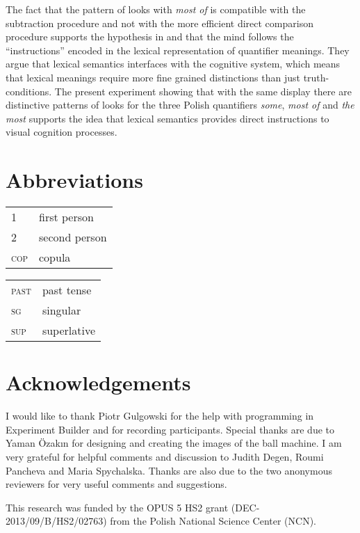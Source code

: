 \documentclass[output=paper]{langscibook}
\begin{document}
The fact that the pattern of looks with \textit{most of} is compatible with the subtraction procedure and not with the
more efficient direct comparison procedure supports the hypothesis in \citet{pietroski2009meaning} and
\citet{lidz2011interface}
that the mind follows the “instructions” encoded in the lexical representation of quantifier meanings. They argue that
lexical semantics interfaces with the cognitive system, which means that lexical meanings require more fine grained
distinctions than just truth-conditions. The present experiment showing that with the same display there are
distinctive patterns of looks for the three Polish quantifiers \textit{some}, \textit{most of} and \textit{the most}
supports the idea that lexical semantics provides direct instructions to visual cognition processes.







%

\section*{Abbreviations}

\begin{tabularx}{.5\textwidth}{@{}lX@{}}
\textsc{1}&first person\\
\textsc{2}&second person\\
\textsc{cop}&{copula}\\
\end{tabularx}%
\begin{tabularx}{.5\textwidth}{@{}lX@{}}
\textsc{past}&past tense\\
\textsc{sg}&singular\\
\textsc{sup}&superlative\\
\end{tabularx}

\section*{Acknowledgements}
I would like to thank Piotr Gulgowski for the help with programming in Experiment Builder and for recording
participants. Special thanks are due to Yaman Özakın for designing and creating the images of the ball machine. I am
very grateful for helpful comments and discussion to Judith Degen, Roumi Pancheva and Maria Spychalska. Thanks are also
due to the two anonymous reviewers for very useful comments and suggestions.

This research was funded by the OPUS 5 HS2 grant (DEC-2013/09/B/HS2/02763) from the Polish National Science Center
(NCN).

{\sloppy\printbibliography[heading=subbibliography,notkeyword=this]}
\end{document}
